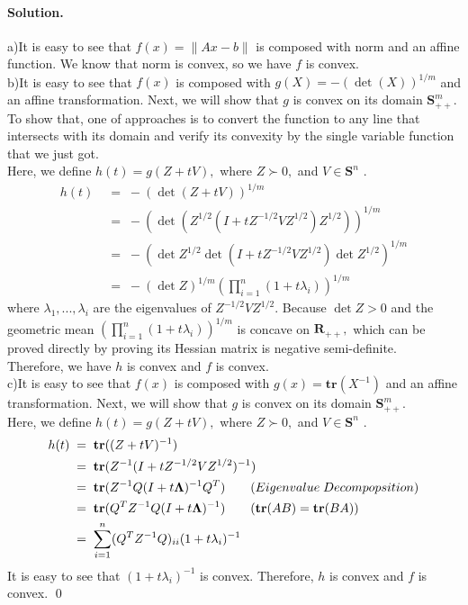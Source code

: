 \documentclass[a4paper]{article}
\newenvironment{solution}
{\color{blue} \paragraph{Solution.\\}}
{\newline \qed}
\begin{document}
\begin{solution}
   a)\;It is easy to see that $f(x)=\|{Ax-b}\|$ is composed with norm and an affine function. We know that norm is convex, so we have $f$ is convex.\\
   b)\;It is easy to see that $f(x)$ is composed with $g(X)=-(\det(X))^{1/m}$ and an affine transformation. Next, we will show that $g$ is convex on its domain $\mathbf{S}^m_{++}$.\\  To show that, one of approaches is to convert the function to any line that intersects with its domain and verify its convexity by the single variable function that we just got.\\Here, we define $h(t)=g(Z+tV),$ where $Z\succ 0,$ and $V\in \mathbf{S}^n$ .
   \begin{equation}\nonumber
   \begin{aligned}
	h(t)\;&=\;-(\det(Z+tV))^{1/m}\\&=\;-(\det (Z^{1/2}(I+tZ^{-1/2}VZ^{1/2})Z^{1/2}))^{1/m}\\&=\;-(\det Z^{1/2}\det(I+tZ^{-1/2}VZ^{1/2})\det Z^{1/2})^{1/m}\\&=\;-(\det Z)^{1/m} \left(\prod_{i=1}^{n}(1+t\lambda_i)\right)^{1/m}
   \end{aligned}
   \end{equation}
   where $\lambda_1,...,\lambda_i$ are the eigenvalues of $Z^{-1/2}VZ^{1/2}.$ Because $\det Z>0$ and the geometric mean $\left(\prod_{i=1}^{n}(1+t\lambda_i)\right)^{1/m}$ is concave on $\mathbf{R}_{++},$ which can be proved directly by proving its Hessian matrix is negative semi-definite.\\Therefore, we have $h$ is convex and $f$ is convex.\\
   c)\;It is easy to see that $f(x)$ is composed with $g(x)=\mathbf{tr}(X^{-1})$ and an affine transformation. Next, we will show that $g$ is convex on its domain $\mathbf{S}^m_{++}$.\\ Here, we define $h(t)=g(Z+tV),$ where $Z\succ 0,$ and $V\in \mathbf{S}^n$ .
   \begin{equation}\nonumber
   \begin{aligned}
	h(t)\;&=\;\mathbf{tr}((Z+tV)^{-1})\\&=\;\mathbf{tr}(Z^{-1}(I+tZ^{-1/2}VZ^{1/2})^{-1})\\&=\;\mathbf{tr}(Z^{-1}Q(I+t\boldsymbol\Lambda)^{-1}Q^T)\quad\quad \text(Eigenvalue\;Decompopsition)\\&=\;\mathbf{tr}(Q^TZ^{-1}Q(I+t\boldsymbol\Lambda)^{-1})\quad\quad (\mathbf{tr}(AB)=\mathbf{tr}(BA))\\&=\; \sum_{i=1}^{n}(Q^TZ^{-1}Q)_{ii}(1+t\lambda_i)^{-1}
   \end{aligned}
   \end{equation}
   It is easy to see that $(1+t\lambda_i)^{-1}$ is convex. Therefore, $h$ is convex and $f$ is convex.
\end{solution}
\end{document}
